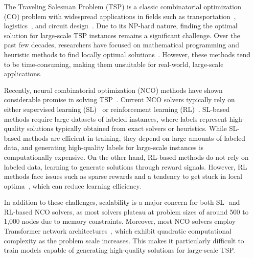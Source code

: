 
The Traveling Salesman Problem (TSP) is a classic combinatorial optimization (CO) problem with widespread applications in fields such as transportation~\cite{wang2021deep}, logistics~\cite{castaneda2022optimizing}, and circuit design~\cite{alkaya2013application}. Due to its NP-hard nature, finding the optimal solution for large-scale TSP instances remains a significant challenge. Over the past few decades, researchers have focused on mathematical programming and heuristic methods to find locally optimal solutions~\cite{applegate2009certification,lin1973effective,helsgaun2000effective}. However, these methods tend to be time-consuming, making them unsuitable for real-world, large-scale applications.


Recently, neural combinatorial optimization (NCO) methods have shown considerable promise in solving TSP~\cite{kwon2020pomo,jin2023pointerformer,drakulic2024bq}. 
Current NCO solvers typically rely on either supervised learning (SL)~\cite{joshi2019efficient,hottung2021learning,luo2023neural} or reinforcement learning (RL)~\cite{bello2016neural,kwon2020pomo,jin2023pointerformer}.  
SL-based methods require large datasets of labeled instances, where labels represent high-quality solutions typically obtained from exact solvers or heuristics. 
While SL-based methods are efficient in training, they depend on large amounts of labeled data, and generating high-quality labels for large-scale instances is computationally expensive.
On the other hand, RL-based methods do not rely on labeled data, learning to generate solutions through reward signals. However, 
RL methods face issues such as sparse rewards and a tendency to get stuck in local optima~\cite{bengio2021machine, min2024unsupervised}, which can reduce learning efficiency.

In addition to these challenges, scalability is a major concern for both SL- and RL-based NCO solvers, as most solvers plateau at problem sizes of around 500 to 1,000 nodes due to memory constraints. 
Moreover, most NCO solvers employ Transformer network architectures~\cite{vaswani2017attention}, which exhibit quadratic computational complexity as the problem scale increases. This makes it particularly difficult to train models capable of generating high-quality solutions for large-scale TSP.


